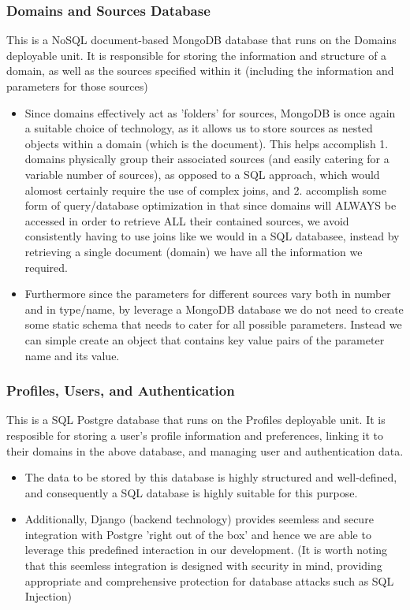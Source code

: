 \documentclass[12pt]{article}
\begin{document}
\subsubsection{Domains and Sources Database}
This is a NoSQL document-based MongoDB database that runs on the Domains deployable unit. It is responsible for storing the information and structure of a domain, as well as the sources specified within it (including the information and parameters for those sources)
\begin{itemize}
    \item Since domains effectively act as 'folders' for sources, MongoDB is once again a suitable choice of technology, as it allows us to store sources as nested objects within a domain (which is the document). This helps accomplish 1. domains physically group their associated sources (and easily catering for a variable number of sources), as opposed to a SQL approach, which would alomost certainly require the use of complex joins, and 2. accomplish some form of query/database optimization in that since domains will ALWAYS be accessed in order to retrieve ALL their contained sources, we avoid consistently having to use joins like we would in a SQL databasee, instead by retrieving a single document (domain) we have all the information we required.
    \item Furthermore since the parameters for different sources vary both in number and in type/name, by leverage a MongoDB database we do not need to create some static schema that needs to cater for all possible parameters. Instead we can simple create an object that contains key value pairs of the parameter name and its value.
\end{itemize}
\subsubsection{Profiles, Users, and Authentication}
This is a SQL Postgre database that runs on the Profiles deployable unit. It is resposible for storing a user's profile information and preferences, linking it to their domains in the above database, and managing user and authentication data.
\begin{itemize}
    \item The data to be stored by this database is highly structured and well-defined, and consequently a SQL database is highly suitable for this purpose.
    \item Additionally, Django (backend technology) provides seemless and secure integration with Postgre 'right out of the box' and hence we are able to leverage this predefined interaction in our development. (It is worth noting that this seemless integration is designed with security in mind, providing appropriate and comprehensive protection for database attacks such as SQL Injection)
\end{itemize}
\end{document}
